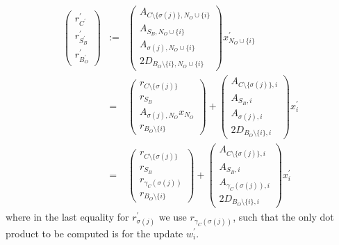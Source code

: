 \documentclass[a4paper]{article}
\begin{document}
\begin{eqnarray}
\left(
\begin{array}{c}
r_{C^{\prime}}^{\prime} \\
\hline
r_{S_{B}^{\prime}}^{\prime} \\
\hline
r_{B_{O}^{\prime}}^{\prime}
\end{array}
\right)
&:=&
\left(
\begin{array}{c}
A_{C \setminus \{\sigma(j)\}, N_{O} \cup \{i\}} \\
\hline
A_{S_{B}, N_{O} \cup \{i\}} \\
\hline
A_{\sigma(j), N_{O} \cup \{i\}} \\
\hline
2D_{B_{O} \setminus \{i\}, N_{O} \cup \{i\}} 
\end{array}
\right)
x_{N_{O} \cup \{i\}}^{\prime} 
\nonumber \\
&=&
\left(
\begin{array}{c}
r_{C \setminus \{\sigma(j)\}} \\
\hline
r_{S_{B}} \\
\hline
A_{\sigma(j), N_{O}}x_{N_{O}} \\
\hline
r_{B_{O} \setminus \{i\}}
\end{array}
\right)
+
\left(
\begin{array}{c}
A_{C \setminus \{\sigma(j)\}, i} \\
\hline
A_{S_{B}, i} \\
\hline
A_{\sigma(j), i} \\
\hline
2D_{B_{O} \setminus \{i\}, i}
\end{array}
\right)
x_{i}^{\prime}
\nonumber \\
&=&
\left(
\begin{array}{c}
r_{C \setminus \{\sigma(j)\}} \\
\hline
r_{S_{B}} \\
\hline
r_{\gamma_{C}(\sigma(j))} \\
\hline
r_{B_{O} \setminus \{i\}}
\end{array}
\right)
+
\left(
\begin{array}{c}
A_{C \setminus \{\sigma(j)\}, i} \\
\hline
A_{S_{B}, i} \\
\hline
A_{\gamma_{C}(\sigma(j)), i} \\
\hline
2D_{B_{O} \setminus \{i\}, i}
\end{array}
\right)
x_{i}^{\prime}
\end{eqnarray}
where in the last equality for $r_{\sigma(j)}^{\prime}$ we use
$r_{\gamma_{C}(\sigma(j))}$, such that the only dot product to be computed
is for the update $w_{i}^{\prime}$. 
\end{document}
